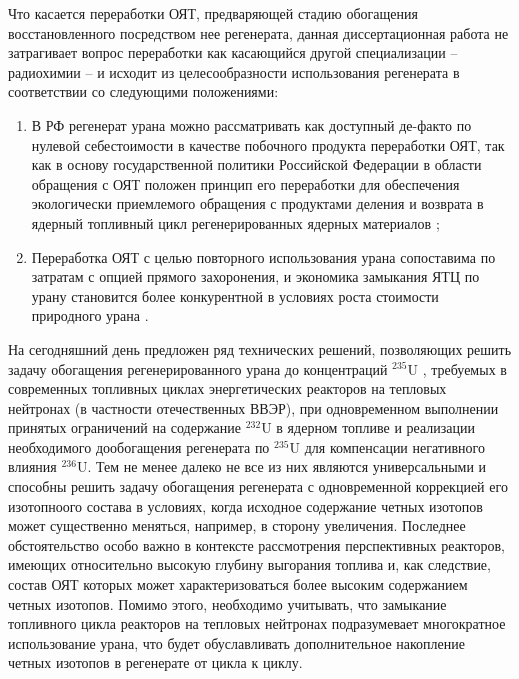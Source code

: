 Что касается переработки ОЯТ, предваряющей стадию обогащения восстановленного посредством нее регенерата, данная диссертационная работа не затрагивает вопрос переработки как касающийся другой специализации -- радиохимии -- и исходит из целесообразности использования регенерата в соответствии со следующими положениями:
\begin{enumerate}
  \item В РФ регенерат урана можно рассматривать как доступный де-факто по нулевой себестоимости в качестве побочного продукта переработки ОЯТ, так как в основу государственной политики Российской Федерации в области обращения с ОЯТ положен принцип его переработки для обеспечения экологически приемлемого обращения с продуктами деления и возврата в ядерный топливный цикл регенерированных ядерных материалов \cite{KoncepciyaPoObrashcheniyu};
  \item Переработка ОЯТ с целью повторного использования урана сопоставима по затратам с опцией прямого захоронения, и экономика замыкания ЯТЦ по урану становится более конкурентной в условиях роста стоимости природного урана \cite{gaoEconomicPotentialFuel2017,moratillasoriaRecyclingLongTermStorage2013,bouchardECONOMICSNUCLEARENERGY}.
\end{enumerate}


На сегодняшний день предложен ряд технических решений, позволяющих решить задачу обогащения регенерированного урана до концентраций $^{235}$U , требуемых в современных топливных циклах энергетических реакторов на тепловых нейтронах (в частности отечественных ВВЭР), при одновременном выполнении принятых ограничений на содержание $^{232}$U в ядерном топливе и реализации необходимого дообогащения регенерата по $^{235}$U для компенсации негативного влияния $^{236}$U. Тем не менее далеко не все из них являются универсальными и способны решить задачу обогащения регенерата с одновременной коррекцией его изотопноого состава в условиях, когда исходное содержание четных изотопов может существенно меняться, например, в сторону увеличения. Последнее обстоятельство особо важно в контексте рассмотрения перспективных реакторов, имеющих относительно высокую глубину выгорания топлива и, как следствие, состав ОЯТ которых может характеризоваться более высоким содержанием четных изотопов. Помимо этого, необходимо учитывать, что замыкание топливного цикла реакторов на тепловых нейтронах подразумевает многократное использование урана, что будет обуславливать дополнительное накопление четных изотопов в регенерате от цикла к циклу.

